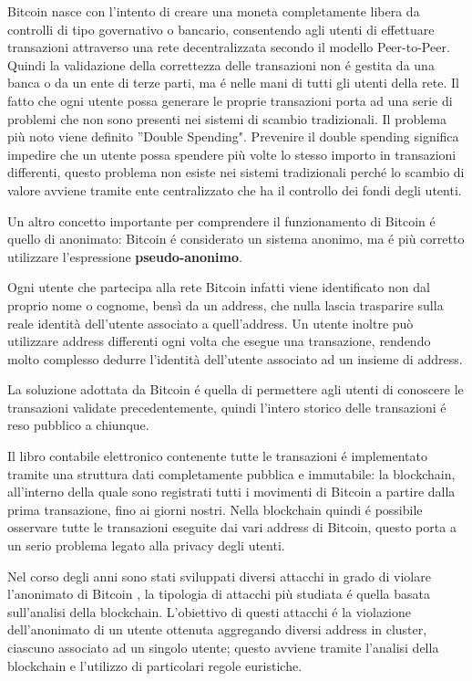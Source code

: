 Bitcoin nasce con l'intento di creare una moneta completamente libera da controlli di tipo governativo o bancario, consentendo agli utenti di effettuare transazioni attraverso una rete decentralizzata secondo il modello Peer-to-Peer. Quindi la validazione della correttezza delle transazioni non é gestita da una banca o da un ente di terze parti, ma é nelle mani di tutti gli utenti della rete. Il fatto che ogni utente possa generare le proprie transazioni porta ad una serie di problemi che non sono presenti nei sistemi di scambio tradizionali. Il problema più noto viene definito ''Double Spending". Prevenire il double spending significa impedire che un utente possa spendere più volte lo stesso importo in transazioni differenti, questo problema non esiste nei sistemi tradizionali perché lo scambio di valore avviene tramite ente centralizzato che ha il controllo dei fondi degli utenti. 

Un altro concetto importante per comprendere il funzionamento di Bitcoin é quello di anonimato: Bitcoin é considerato un sistema anonimo, ma é più corretto utilizzare l’espressione \textbf{pseudo-anonimo}.

Ogni utente che partecipa alla rete Bitcoin infatti viene identificato non dal proprio nome o cognome, bensì da un address, che nulla lascia trasparire sulla reale identità dell'utente associato a quell'address. Un utente inoltre può utilizzare address differenti ogni volta che esegue una transazione, rendendo molto complesso dedurre l'identità dell'utente associato ad un insieme di address.

La soluzione adottata da Bitcoin é quella di permettere agli utenti di conoscere le transazioni validate precedentemente, quindi l'intero storico delle transazioni é reso pubblico a chiunque.

Il libro contabile elettronico contenente tutte le transazioni é implementato tramite una struttura dati completamente pubblica e immutabile: la blockchain, all’interno della quale sono registrati tutti i movimenti di Bitcoin a partire dalla prima transazione, fino ai giorni nostri. Nella blockchain quindi é possibile osservare tutte le transazioni eseguite dai vari address di Bitcoin, questo porta a un serio problema legato alla privacy degli utenti. 

Nel corso degli anni sono stati sviluppati diversi attacchi in grado di violare l'anonimato di Bitcoin \cite{de-anonimizzazione}, la tipologia di attacchi più studiata é quella basata sull'analisi della blockchain. L'obiettivo di questi attacchi é la violazione dell'anonimato di un utente ottenuta aggregando diversi address in cluster, ciascuno associato ad un singolo utente; questo avviene tramite l'analisi della blockchain e l'utilizzo di particolari regole euristiche.

